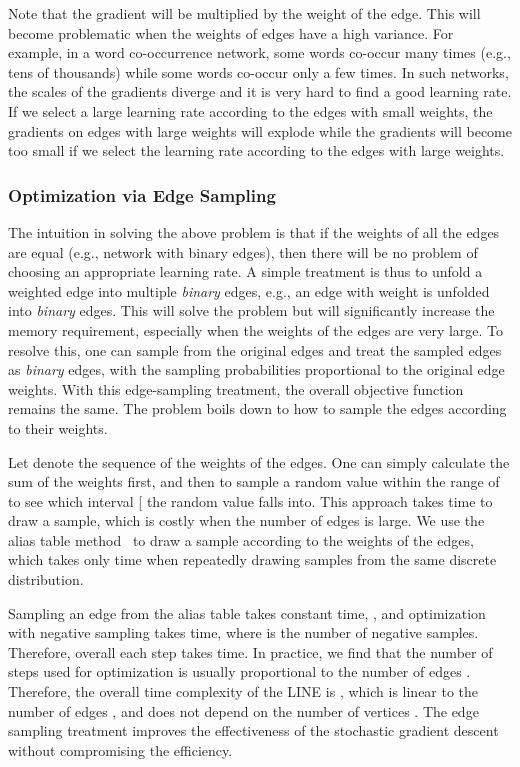 \documentclass{sig-alternate-2013}
\begin{document}
Note that the gradient will be multiplied by the weight of the edge. This will become problematic when the weights of edges have a high variance. For example, in a word co-occurrence network, some words co-occur many times (e.g., tens of thousands) while some words co-occur only a few times. In such networks, the scales of the gradients diverge and it is very hard to find a good learning rate. If we select a large learning rate according to the edges with small weights, the gradients on edges with large weights will explode while the gradients will become too small if we select the learning rate according to the edges with large weights.   

\subsubsection{Optimization via Edge Sampling}
The intuition in solving the above problem is that if the weights of all the edges are equal (e.g., network with binary edges), then there will be no problem of choosing an appropriate learning rate. A simple treatment is thus to unfold a weighted edge into multiple \emph{binary} edges, e.g., an edge with weight  is unfolded into  \emph{binary} edges. This will solve the problem but will significantly increase the memory requirement, especially when the weights of the edges are very large. To resolve this, one can sample from the original edges and treat the sampled edges as \emph{binary} edges, with the sampling probabilities proportional to the original edge weights. With this edge-sampling treatment, the overall objective function remains the same. The problem boils down to how to sample the edges according to their weights. 

Let  denote the sequence of the weights of the edges. One can simply calculate the sum of the weights  first, and then to sample a random value within the range of  to see which interval [ the random value falls into. This approach takes  time to draw a sample, which is costly when the number of edges  is large. We use the alias table method~\cite{li2014reducing} to draw a sample according to the weights of the edges, which takes only  time when repeatedly drawing samples from the same discrete distribution.  



Sampling an edge from the alias table takes constant time, , and optimization with negative sampling takes  time, where  is the number of negative samples. Therefore, overall each step takes  time. In practice, we find that the number of steps used for optimization is usually proportional to the number of edges . Therefore, the overall time complexity of the LINE is , which is linear to the number of edges , and does not depend on the number of vertices . The edge sampling treatment improves the effectiveness of the stochastic gradient descent without compromising the efficiency.  
\end{document}

